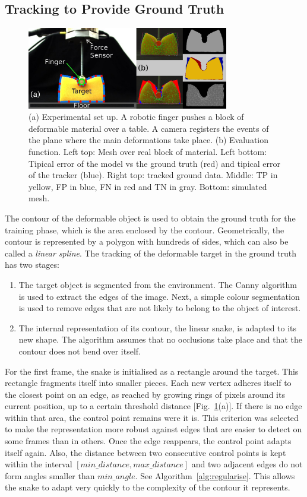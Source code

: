 \documentclass[journal]{IEEEtran}
\newcommand{\fref}[1]{Fig.~\ref{#1}}
\newcommand{\alref}[1]{Algorithm~\ref{#1}}
\newcounter{algorithm}
\begin{document}
\subsection{Tracking to Provide Ground Truth}

\begin{figure}[!t]
\centering
\includegraphics[width=88mm]{arrio2}
\caption{(a) Experimental set up.  A robotic finger pushes a block of deformable material over a table.  A camera registers the events of the plane where the main deformations take place.  (b) Evaluation function.  Left top: Mesh over real block of material.  Left bottom: Tipical error of the model vs the ground truth (red) and tipical error of the tracker (blue).  Right top: tracked ground data.  Middle: TP in yellow, FP in blue, FN in red and TN in gray.  Bottom: simulated mesh. }
\label{fig:scene}
\end{figure}

The contour of the deformable object is used to obtain the ground truth for the training phase, which is the area enclosed by the contour. Geometrically, the contour is represented by a polygon with hundreds of sides, which can also be called a \textit{linear spline}.  The tracking of the deformable target in the ground truth has two stages:
\begin{enumerate}
 \item The target object is segmented from the environment.  The Canny algorithm is used to extract the edges of the image.  Next, a simple colour segmentation is used to remove edges that are not likely to belong to the object of interest.
 \item The internal representation of its contour, the linear snake, is adapted to its new shape.  The algorithm assumes that no occlusions take place and that the contour does not bend over itself.
\end{enumerate}
For the first frame, the snake is initialised as a rectangle around the target. This rectangle fragments itself into smaller pieces. Each new vertex adheres itself to the closest point on an edge, as reached by growing rings of pixels around its current position, up to a certain threshold distance [\fref{fig:scene}(a)].  If there is no edge within that area, the control point remains were it is. This criterion was selected to make the representation more robust against edges that are easier to detect on some frames than in others.  Once the edge reappears, the control point adapts itself again.  Also, the distance between two consecutive control points is kept within the interval $[min\_distance, max\_distance]$ and two adjacent edges do not form angles smaller than $min\_angle$.  See \alref{alg:regularise}.  This allows the snake to adapt very quickly to the complexity of the contour it represents.
\end{document}
